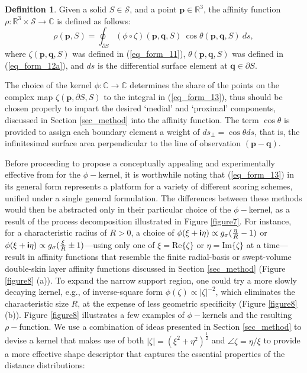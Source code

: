 \documentclass[article]{gmp2014}
\theoremstyle{definition}
\newtheorem{defn}{\textsf{\textbf{{Definition}}}}
\newcommand{\ii}{\text{\textsf{\textbf{i}}}}
\begin{document}
\begin{defn}
    Given a solid $S \in \mathcal{S}$, and a point $\mathbf{p} \in \mathds{R}^3$, the affinity function $\rho: \mathds{R}^3 \times \mathcal{S} \rightarrow \mathds{C}$ is defined as follows:
    \begin{equation}
        \rho(\mathbf{p}, S) = \oint_{\partial S} (\phi \circ \zeta)(\mathbf{p}, \mathbf{q}, S) ~\cos \theta(\mathbf{p}, \mathbf{q}, S) ~ d s, \label{eq_form_13}
    \end{equation}
    where $\zeta(\mathbf{p}, \mathbf{q}, S)$ was defined in {\rm (\ref{eq_form_11})}, $\theta(\mathbf{p}, \mathbf{q}, S)$ was defined in {\rm (\ref{eq_form_12a})}, and $d s$ is the differential surface element at $\mathbf{q} \in \partial S$.
\end{defn}
%
The choice of the kernel $\phi: \mathds{C} \rightarrow \mathds{C}$ determines the share of the points on the complex map $\zeta(\mathbf{p}, \partial S, S)$ to the integral in (\ref{eq_form_13}), thus should be chosen properly to impart the desired `medial' and `proximal' components, discussed in Section \ref{sec_method} into the affinity function. The term $\cos \theta$ is provided to assign each boundary element a weight of $d s_\bot = \cos \theta d s$, that is, the infinitesimal surface area perpendicular to the line of observation $(\mathbf{p} - \mathbf{q})$.

Before proceeding to propose a conceptually appealing and experimentally effective from for the $\phi-$kernel, it is worthwhile noting that (\ref{eq_form_13}) in its general form represents a platform for a variety of different scoring schemes, unified under a single general formulation. The differences between these methods would then be abstracted only in their particular choice of the $\phi-$kernel, as a result of the process decomposition illustrated in Figure \ref{figure7}. For instance, for a characteristic radius of $R > 0$, a choice of $\phi(\xi + \ii \eta) \propto g_\sigma(\frac{\eta}{R} - 1)$ or $\phi(\xi + \ii \eta) \propto g_\sigma(\frac{\xi}{R} \pm 1)$---using only one of $\xi = \mathrm{Re}\{ \zeta\}$ or $\eta = \mathrm{Im}\{ \zeta\}$ at a time---result in affinity functions that resemble the finite radial-basis or swept-volume double-skin layer affinity functions discussed in Section \ref{sec_method} (Figure \ref{figure8} (a)). To expand the narrow support region, one could try a more slowly decaying kernel, e.g., of inverse-square form $\phi(\zeta) \propto |\zeta|^{-2}$, which eliminates the characteristic size $R$, at the expense of less geometric specificity (Figure \ref{figure8} (b)). Figure \ref{figure8} illustrates a few examples of $\phi-$kernels and the resulting $\rho-$function.
%
We use a combination of ideas presented in Section \ref{sec_method} to devise a kernel that makes use of both $|\zeta| = (\xi^2 + \eta^2)^\frac{1}{2}$ and $\angle \zeta = \eta /\xi$ to provide a more effective shape descriptor that captures the essential properties of the distance distributions:
\end{document}
